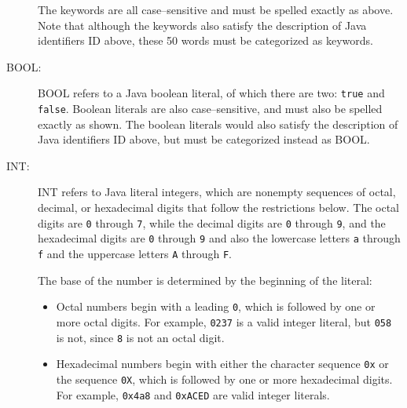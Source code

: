 \documentclass[11pt]{article}
\begin{document}
\begin{description}
                The keywords are all case--sensitive and must be spelled
                exactly as above.  Note that although the keywords also
                satisfy the description of Java identifiers ID above, these
                50 words must be categorized as keywords.

          \item[BOOL:] BOOL refers to a Java boolean literal, of which there
                are two: \texttt{true} and \texttt{false}.  Boolean literals
                are also case--sensitive, and must also be spelled exactly
                as shown.  The boolean literals would also satisfy the
                description of Java identifiers ID above, but must be
                categorized instead as BOOL.

          \item[INT:] INT refers to Java literal integers, which are
                nonempty sequences of octal, decimal, or hexadecimal digits
                that follow the restrictions below.  The octal digits are
                \texttt{0} through \texttt{7}, while the decimal digits are
                \texttt{0} through \texttt{9}, and the hexadecimal digits
                are \texttt{0} through \texttt{9} and also the lowercase
                letters \texttt{a} through \texttt{f} and the uppercase
                letters \texttt{A} through \texttt{F}.

                The base of the number is determined by the beginning of the
                literal:

                \vspace{-2.5mm}

                \begin{itemize}

                  \item Octal numbers begin with a leading \texttt{0}, which
                        is followed by one or more octal digits.  For
                        example, \texttt{0237} is a valid integer literal,
                        but \texttt{058} is not, since \texttt{8} is not an
                        octal digit.

                  \item Hexadecimal numbers begin with either the character
                        sequence \texttt{0x} or the sequence \texttt{0X},
                        which is followed by one or more hexadecimal digits.
                        For example, \texttt{0x4a8} and \texttt{0xACED} are
                        valid integer literals.


\end{itemize}
\end{description}
\end{document}
